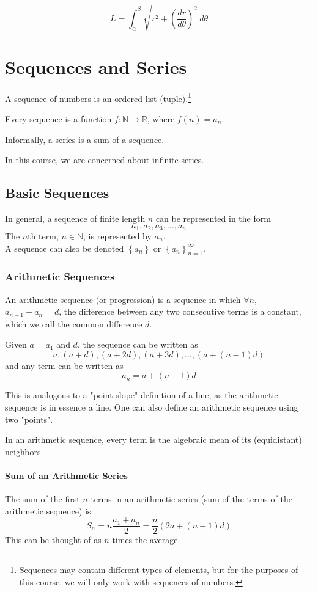 \documentclass{article}
\begin{document}
$$L = \int_{\alpha}^{\beta} \sqrt{r^2 + \left(\frac{dr}{d\theta}\right)^2} \,d\theta$$

\section{Sequences and Series}
A sequence of numbers is an ordered list (tuple).\footnote{Sequences may contain different types of elements, but for the purposes of this course, we will only work with sequences of numbers.}

Every sequence is a function $f: \mathbb{N} \to \mathbb{R}$, where $f(n) = a_n$.

Informally, a series is a sum of a sequence.

In this course, we are concerned about infinite series.

\subsection{Basic Sequences}
In general, a sequence of finite length $n$ can be represented in the form
$$a_1, a_2, a_3, \ldots, a_n $$
The $n$th term, $n \in \mathbb{N}$, is represented by $a_n$.\\
A sequence can also be denoted $\left\{ a_n \right\}$ or $\left\{ a_n \right\}_{n = 1}^\infty$.

\subsubsection{Arithmetic Sequences}
An arithmetic sequence (or progression) is a sequence in which $\forall n$, $a_{n+1} - a_n = d$, the difference between any two consecutive terms is a constant, which we call the common difference $d$.

Given $a = a_1$ and $d$, the sequence can be written as
$$a, \left(a + d\right), \left(a + 2d\right), \left(a + 3d\right), \ldots, \left(a + \left(n-1\right)d\right)$$
and any term can be written as
$$a_n = a + (n-1)d$$

This is analogous to a "point-slope" definition of a line, as the arithmetic sequence is in essence a line. One can also define an arithmetic sequence using two "points".

In an arithmetic sequence, every term is the algebraic mean of its (equidistant) neighbors.

\paragraph{Sum of an Arithmetic Series}
The sum of the first $n$ terms in an arithmetic series (sum of the terms of the arithmetic sequence) is
$$S_n = n\frac{a_1+a_n}{2} = \frac{n}{2}\left(2a + \left(n-1\right)d\right)$$
This can be thought of as $n$ times the average.
\end{document}
